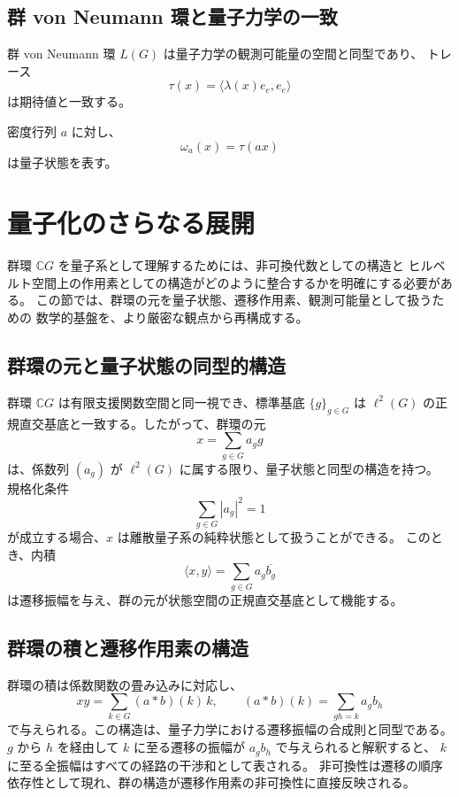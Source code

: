 \documentclass[12pt,a4paper]{ltjarticle}
\theoremstyle{definition}
\begin{document}
\subsection{群 von Neumann 環と量子力学の一致}

群 von Neumann 環 $L(G)$ は量子力学の観測可能量の空間と同型であり、
トレース
\[
\tau(x)=\langle \lambda(x)e_e,e_e\rangle
\]
は期待値と一致する。

密度行列 $a$ に対し、
\[
\omega_a(x)=\tau(ax)
\]
は量子状態を表す。

\section{量子化のさらなる展開}

群環 $\mathbb{C}G$ を量子系として理解するためには、非可換代数としての構造と
ヒルベルト空間上の作用素としての構造がどのように整合するかを明確にする必要がある。
この節では、群環の元を量子状態、遷移作用素、観測可能量として扱うための
数学的基盤を、より厳密な観点から再構成する。

\subsection{群環の元と量子状態の同型的構造}

群環 $\mathbb{C}G$ は有限支援関数空間と同一視でき、標準基底 $\{g\}_{g\in G}$ は
$\ell^2(G)$ の正規直交基底と一致する。したがって、群環の元
\[
x=\sum_{g\in G}a_g g
\]
は、係数列 $(a_g)$ が $\ell^2(G)$ に属する限り、量子状態と同型の構造を持つ。
規格化条件
\[
\sum_{g\in G}|a_g|^2=1
\]
が成立する場合、$x$ は離散量子系の純粋状態として扱うことができる。
このとき、内積
\[
\langle x,y\rangle=\sum_{g\in G}a_g\overline{b_g}
\]
は遷移振幅を与え、群の元が状態空間の正規直交基底として機能する。

\subsection{群環の積と遷移作用素の構造}

群環の積は係数関数の畳み込みに対応し、
\[
xy=\sum_{k\in G}(a*b)(k)\,k,\qquad (a*b)(k)=\sum_{gh=k}a_g b_h
\]
で与えられる。この構造は、量子力学における遷移振幅の合成則と同型である。
$g$ から $h$ を経由して $k$ に至る遷移の振幅が $a_g b_h$ で与えられると解釈すると、
$k$ に至る全振幅はすべての経路の干渉和として表される。
非可換性は遷移の順序依存性として現れ、群の構造が遷移作用素の非可換性に直接反映される。
\end{document}
